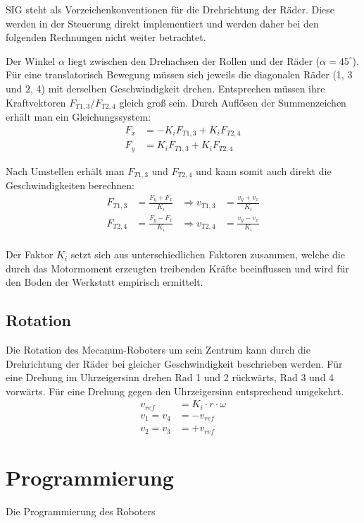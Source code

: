 \documentclass[a4paper]{article}
\begin{document}
SIG steht als Vorzeichenkonventionen für die Drehrichtung der Räder. Diese werden in der Steuerung direkt implementiert und werden daher bei den folgenden Rechnungen nicht weiter betrachtet.

Der Winkel $ \alpha $ liegt zwischen den Drehachsen der Rollen und der Räder ($\alpha = 45^\circ$).
Für eine translatorisch Bewegung müssen sich jeweils die diagonalen Räder (1, 3 und 2, 4) mit derselben Geschwindigkeit drehen. Entsprechen müssen ihre Kraftvektoren $F_{T1, 3} / F_{T2, 4}$ gleich groß sein.
Durch Auflösen der Summenzeichen erhält man ein Gleichungssystem:
\begin{align*}
    F_x &= - K_i F_{T1, 3} + K_i F_{T2, 4} \\
    F_y &= K_i F_{T1, 3}   + K_i F_{T2, 4}
\end{align*}

Nach Umstellen erhält man $F_{T1, 3}$ und $F_{T2, 4}$ und kann somit auch direkt die Geschwindigkeiten berechnen:
\begin{align*}
    F_{T1, 3} &= \frac{F_y + F_x}{K_i} &\Rightarrow v_{T1, 3} &= \frac{v_y + v_x}{K_i} \\
    F_{T2, 4} &= \frac{F_y - F_x}{K_i} &\Rightarrow v_{T2, 4} &= \frac{v_y - v_x}{K_i} \\
\end{align*}

Der Faktor $K_i$ setzt sich aus unterschiedlichen Faktoren zusammen, welche die durch das Motormoment erzeugten treibenden Kräfte beeinflussen und wird für den Boden der Werkstatt empirisch ermittelt.


\subsection{Rotation}
Die Rotation des Mecanum-Roboters um sein Zentrum kann durch die Drehrichtung der Räder bei gleicher Geschwindigkeit beschrieben werden.
Für eine Drehung im Uhrzeigersinn drehen Rad 1 und 2 rückwärts, Rad 3 und 4 vorwärts. Für eine Drehung gegen den Uhrzeigersinn entsprechend umgekehrt.
\begin{align*}
    v_{ref} &= K_i \cdot r \cdot \omega \\
    v_1 = v_4 &= - v_{ref}              \\
    v_2 = v_3 &= + v_{ref}
\end{align*}


\section{Programmierung}
Die Programmierung des Roboters
\end{document}
